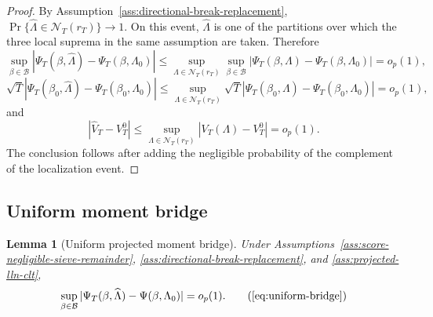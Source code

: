 \documentclass[12pt]{article}
\numberwithin{equation}{section}
\newtheorem{lemma}{Lemma}
\theoremstyle{definition}
\newcommand{\op}{o_p}
\begin{document}
\begin{proof}
By Assumption~\ref{ass:directional-break-replacement},
\(\Pr\{\widehat\Lambda\in\mathcal N_T(r_T)\}\to1\). On this event,
\(\widehat\Lambda\) is one of the partitions over which the three local
suprema in the same assumption are taken. Therefore
\[
    \sup_{\beta\in\mathcal B}
    |\Psi_T(\beta,\widehat\Lambda)-\Psi_T(\beta,\Lambda_0)|
    \le
    \sup_{\Lambda\in\mathcal N_T(r_T)}\sup_{\beta\in\mathcal B}
    |\Psi_T(\beta,\Lambda)-\Psi_T(\beta,\Lambda_0)|=\op(1),
\]
\[
    \sqrt T|\Psi_T(\beta_0,\widehat\Lambda)-\Psi_T(\beta_0,\Lambda_0)|
    \le
    \sup_{\Lambda\in\mathcal N_T(r_T)}
    \sqrt T|\Psi_T(\beta_0,\Lambda)-\Psi_T(\beta_0,\Lambda_0)|=\op(1),
\]
and
\[
    |\widehat V_T-V_T^0|
    \le
    \sup_{\Lambda\in\mathcal N_T(r_T)}|V_T(\Lambda)-V_T^0|=\op(1).
\]
The conclusion follows after adding the negligible probability of the complement
of the localization event.
\end{proof}

\subsection{Uniform moment bridge}

\begin{lemma}[Uniform projected moment bridge]
\label{lem:part2-uniform-bridge}
Under Assumptions~\ref{ass:score-negligible-sieve-remainder},
\ref{ass:directional-break-replacement}, and \ref{ass:projected-lln-clt},
\begin{equation}
    \sup_{\beta\in\mathcal B}
    |\Psi_T(\beta,\widehat\Lambda)-\Psi(\beta,\Lambda_0)|=\op(1).
    \tag{\ref{eq:uniform-bridge}}
\end{equation}
\end{lemma}
\end{document}
